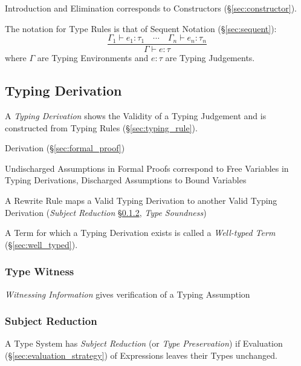 Introduction and Elimination corresponds to Constructors
(\S\ref{sec:constructor}).

The notation for Type Rules is that of Sequent Notation
(\S\ref{sec:sequent}):
\[
  {
    \frac
    { \Gamma_1 \vdash e_1:\tau_1 \quad \cdots
      \quad \Gamma_n \vdash e_n:\tau_n }
    { \Gamma \vdash e:\tau }
  }
\]
where $\Gamma$ are Typing Environments and $e:\tau$ are Typing
Judgements.



\subsection{Typing Derivation}\label{sec:typing_derivation}

A \emph{Typing Derivation} shows the Validity of a Typing Judgement
and is constructed from Typing Rules (\S\ref{sec:typing_rule}).

Derivation (\S\ref{sec:formal_proof})

Undischarged Assumptions in Formal Proofs correspond to Free Variables
in Typing Derivations, Discharged Assumptions to Bound Variables

A Rewrite Rule maps a Valid Typing Derivation to another Valid Typing
Derivation (\emph{Subject Reduction} \S\ref{sec:subject_reduction},
\emph{Type Soundness}) \cite{wadler14}

A Term for which a Typing Derivation exists is called a
\emph{Well-typed Term} (\S\ref{sec:well_typed}).



\subsubsection{Type Witness}\label{sec:type_witness}

\emph{Witnessing Information} gives verification of a Typing
Assumption



\subsubsection{Subject Reduction}\label{sec:subject_reduction}

A Type System has \emph{Subject Reduction} (or \emph{Type
  Preservation}) if Evaluation (\S\ref{sec:evaluation_strategy}) of
Expressions leaves their Types unchanged.



